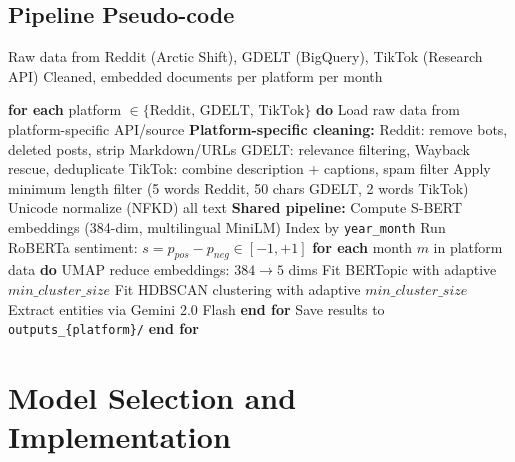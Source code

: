 \documentclass[12pt, letterpaper]{article}
\newenvironment{pseudoblock}[1]{%
  \begin{mdframed}[
    backgroundcolor=pseudobg,
    linecolor=pseudoframe,
    linewidth=1.5pt,
    frametitle={\color{pseudoframe}\bfseries\small Pseudo-code: #1},
    frametitlebackgroundcolor=pseudoframe!15
  ]
  \begin{algorithmic}[1]
}{%
  \end{algorithmic}
  \end{mdframed}
}
\begin{document}
\subsection{Pipeline Pseudo-code}

\begin{pseudoblock}{End-to-End Data Preprocessing Pipeline}
\REQUIRE Raw data from Reddit (Arctic Shift), GDELT (BigQuery), TikTok (Research API)
\ENSURE Cleaned, embedded documents per platform per month

\STATE \textbf{for each} platform $\in \{\text{Reddit, GDELT, TikTok}\}$ \textbf{do}
\STATE \quad Load raw data from platform-specific API/source
\STATE \quad \textbf{Platform-specific cleaning:}
\STATE \quad \quad Reddit: remove bots, deleted posts, strip Markdown/URLs
\STATE \quad \quad GDELT: relevance filtering, Wayback rescue, deduplicate
\STATE \quad \quad TikTok: combine description + captions, spam filter
\STATE \quad Apply minimum length filter (5 words Reddit, 50 chars GDELT, 2 words TikTok)
\STATE \quad Unicode normalize (NFKD) all text
\STATE \quad \textbf{Shared pipeline:}
\STATE \quad Compute S-BERT embeddings (384-dim, multilingual MiniLM)
\STATE \quad Index by \texttt{year\_month}
\STATE \quad Run RoBERTa sentiment: $s = p_{pos} - p_{neg} \in [-1, +1]$
\STATE \quad \textbf{for each} month $m$ in platform data \textbf{do}
\STATE \quad \quad UMAP reduce embeddings: $384 \to 5$ dims
\STATE \quad \quad Fit BERTopic with adaptive $min\_cluster\_size$
\STATE \quad \quad Fit HDBSCAN clustering with adaptive $min\_cluster\_size$
\STATE \quad \quad Extract entities via Gemini 2.0 Flash
\STATE \quad \textbf{end for}
\STATE \quad Save results to \texttt{outputs\_\{platform\}/}
\STATE \textbf{end for}
\end{pseudoblock}

\section{Model Selection and Implementation}
\label{sec:model}
\end{document}
